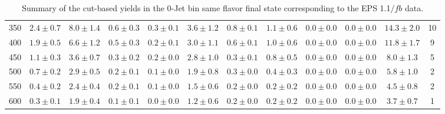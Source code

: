 \begin{table}[!hb]
{\begin{center}
\begin{tabular}{l c c c c c c c c c c c }
350 & $2.4\pm0.7$ & $8.0\pm1.4$ & $0.6\pm0.3$ & $0.3\pm0.1$ & $3.6\pm1.2$ & $0.8\pm0.1$ & $1.1\pm0.6$ & $0.0\pm0.0$ & $0.0\pm0.0$ & $14.3\pm2.0$ & 10 \\
400 & $1.9\pm0.5$ & $6.6\pm1.2$ & $0.5\pm0.3$ & $0.2\pm0.1$ & $3.0\pm1.1$ & $0.6\pm0.1$ & $1.0\pm0.6$ & $0.0\pm0.0$ & $0.0\pm0.0$ & $11.8\pm1.7$ & 9 \\
450 & $1.1\pm0.3$ & $3.6\pm0.7$ & $0.3\pm0.2$ & $0.2\pm0.0$ & $2.8\pm1.0$ & $0.3\pm0.1$ & $0.8\pm0.5$ & $0.0\pm0.0$ & $0.0\pm0.0$ & $8.0\pm1.3$ & 5 \\
500 & $0.7\pm0.2$ & $2.9\pm0.5$ & $0.2\pm0.1$ & $0.1\pm0.0$ & $1.9\pm0.8$ & $0.3\pm0.0$ & $0.4\pm0.3$ & $0.0\pm0.0$ & $0.0\pm0.0$ & $5.8\pm1.0$ & 2 \\
550 & $0.4\pm0.2$ & $2.4\pm0.4$ & $0.2\pm0.1$ & $0.1\pm0.0$ & $1.5\pm0.6$ & $0.2\pm0.0$ & $0.2\pm0.2$ & $0.0\pm0.0$ & $0.0\pm0.0$ & $4.5\pm0.8$ & 2 \\
600 & $0.3\pm0.1$ & $1.9\pm0.4$ & $0.1\pm0.1$ & $0.0\pm0.0$ & $1.2\pm0.6$ & $0.2\pm0.0$ & $0.2\pm0.2$ & $0.0\pm0.0$ & $0.0\pm0.0$ & $3.7\pm0.7$ & 1 \\
\hline
\end{tabular}
\end{center}
}
\caption{Summary of the cut-based yields in the 0-Jet bin same flavor final state corresponding to the EPS 1.1$/fb$ data.}
\end{table}
